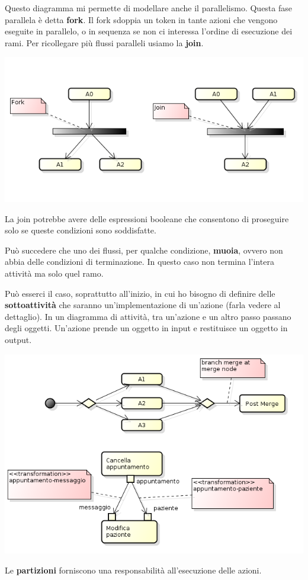 Questo diagramma mi permette di modellare anche il parallelismo. Questa fase parallela è detta \textbf{fork}. Il fork sdoppia un token in tante azioni che vengono eseguite in parallelo, o in sequenza se non ci interessa l'ordine di esecuzione dei rami. Per ricollegare più flussi paralleli usiamo la \textbf{join}.

\begin{center}
\includegraphics[width=0.75\columnwidth]{img6} %
\end{center}

La join potrebbe avere delle espressioni booleane che consentono di proseguire solo se queste condizioni sono soddisfatte.

Può succedere che uno dei flussi, per qualche condizione, \textbf{muoia}, ovvero non abbia delle condizioni di terminazione. In questo caso non termina l'intera attività ma solo quel ramo.

Può esserci il caso, soprattutto all'inizio, in cui ho bisogno di definire delle \textbf{sottoattività} che saranno un'implementazione di un'azione (farla vedere al dettaglio). In un diagramma di attività, tra un'azione e un altro passo passano degli oggetti. Un'azione prende un oggetto in input e restituisce un oggetto in output.

\begin{center}
\includegraphics[width=0.75\columnwidth]{img7} %
\end{center}

Le \textbf{partizioni} forniscono una responsabilità all'esecuzione delle azioni.